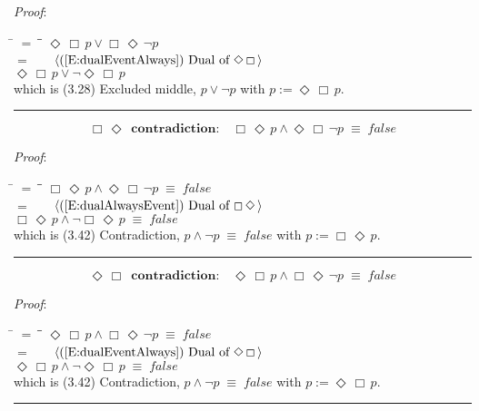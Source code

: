 \documentclass[12pt, fleqn, leqno]{article}
\newcommand{\lgap}{2pt}                             %
\newcommand{\mymathindent}{24pt}                    %
\newcommand{\equivs}{\ensuremath{\;\equiv\;}}       %
\newcommand{\Event}{\Diamond\,}
\newcommand{\Always}{\Box\,}
\newcommand{\myqed}{\rule[-.23ex]{1.2ex}{2.0ex}}
\newcommand{\myqedtab}{\hspace{384pt}}              %
\newcommand{\Gll} {\langle}                         %
\newcommand{\Ggg} {\rangle}                         %
\newcommand{\Hint}[1]     {\ \ \ $\Gll              \mbox{#1} \Ggg$ }   %
\begin{document}
\emph{Proof}:
\begin{tabbing}
\hspace{\mymathindent} \= $= \;$ \= \myqedtab \= \kill
  \> \>   $\Event \Always p \lor \Always \Event \neg p$\\[\lgap]
  \> $=$  \>  \Hint{(\ref{E:dualEventAlways}) Dual of $\Event \Always$}\\[\lgap]
  \> \>   $\Event \Always p \lor \neg \Event \Always p$\\[\lgap]
  \> which is (3.28) Excluded middle, $p\lor\neg p$ with $p := \Event \Always p$. \quad \myqed
\end{tabbing}
\begin{equation}\label{E:AEcontradiction}
\textbf{$\Always \Event$ contradiction:}\quad \Always \Event p \land \Event \Always\neg p \equivs false
\end{equation}

\emph{Proof}:
\begin{tabbing}
\hspace{\mymathindent} \= $= \;$ \= \myqedtab \= \kill
  \> \>   $\Always \Event p \land \Event \Always\neg p \equivs false$\\[\lgap]
 \> $=$  \>  \Hint{(\ref{E:dualAlwaysEvent}) Dual of $\Always \Event$}\\[\lgap]
  \> \>   $\Always \Event p \land \neg \Always \Event p \equivs false$\\[\lgap]
  \> which is (3.42) Contradiction, $p\land\neg p \equivs false$ with $p := \Always\Event p$. \quad \myqed
\end{tabbing}
\begin{equation}\label{E:EAcontradiction}
\textbf{$\Event \Always$ contradiction:}\quad \Event \Always p \land  \Always \Event\neg p \equivs false
\end{equation}

\emph{Proof}:
\begin{tabbing}
\hspace{\mymathindent} \= $= \;$ \= \myqedtab \= \kill
  \> \>   $\Event \Always p \land  \Always \Event\neg p \equivs false$\\[\lgap]
 \> $=$  \>  \Hint{(\ref{E:dualEventAlways}) Dual of $\Event \Always$}\\[\lgap]
  \> \>   $\Event \Always p \land \neg \Event \Always p \equivs false$\\[\lgap]
  \> which is (3.42) Contradiction, $p\land\neg p \equivs false$ with $p := \Event\Always p$. \quad \myqed
\end{tabbing}
\end{document}
